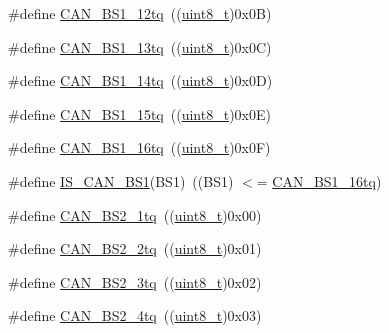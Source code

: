 \begin{DoxyCompactItemize}
\item 
\#define \hyperlink{group___c_a_n__time__quantum__in__bit__segment__1_ga14c4e928f615babc14c6a9e80ee86a6c}{C\+A\+N\+\_\+\+B\+S1\+\_\+12tq}~((\hyperlink{_p_e___types_8h_aba7bc1797add20fe3efdf37ced1182c5}{uint8\+\_\+t})0x0\+B)
\item 
\#define \hyperlink{group___c_a_n__time__quantum__in__bit__segment__1_ga2087caec94be44837c1e6965da7f6236}{C\+A\+N\+\_\+\+B\+S1\+\_\+13tq}~((\hyperlink{_p_e___types_8h_aba7bc1797add20fe3efdf37ced1182c5}{uint8\+\_\+t})0x0\+C)
\item 
\#define \hyperlink{group___c_a_n__time__quantum__in__bit__segment__1_gac0c71e1020a4fbaf66bce754bd54d8cb}{C\+A\+N\+\_\+\+B\+S1\+\_\+14tq}~((\hyperlink{_p_e___types_8h_aba7bc1797add20fe3efdf37ced1182c5}{uint8\+\_\+t})0x0\+D)
\item 
\#define \hyperlink{group___c_a_n__time__quantum__in__bit__segment__1_gaa52c8674dc7caae1089e5276cd13db5f}{C\+A\+N\+\_\+\+B\+S1\+\_\+15tq}~((\hyperlink{_p_e___types_8h_aba7bc1797add20fe3efdf37ced1182c5}{uint8\+\_\+t})0x0\+E)
\item 
\#define \hyperlink{group___c_a_n__time__quantum__in__bit__segment__1_ga3be52c699f5618cc318c143ee42f5966}{C\+A\+N\+\_\+\+B\+S1\+\_\+16tq}~((\hyperlink{_p_e___types_8h_aba7bc1797add20fe3efdf37ced1182c5}{uint8\+\_\+t})0x0\+F)
\item 
\#define \hyperlink{group___c_a_n__time__quantum__in__bit__segment__1_ga225f1457e1c6b8fc3b5af0f463933152}{I\+S\+\_\+\+C\+A\+N\+\_\+\+B\+S1}(B\+S1)~((B\+S1) $<$= \hyperlink{openmotestm_2library_2inc_2stm32f10x__can_8h_a3be52c699f5618cc318c143ee42f5966}{C\+A\+N\+\_\+\+B\+S1\+\_\+16tq})
\item 
\#define \hyperlink{group___c_a_n__time__quantum__in__bit__segment__2_gad9af25a3f61df7b09b8d6a5e81d8027e}{C\+A\+N\+\_\+\+B\+S2\+\_\+1tq}~((\hyperlink{_p_e___types_8h_aba7bc1797add20fe3efdf37ced1182c5}{uint8\+\_\+t})0x00)
\item 
\#define \hyperlink{group___c_a_n__time__quantum__in__bit__segment__2_gac43d82f74990620499f1998187ff3602}{C\+A\+N\+\_\+\+B\+S2\+\_\+2tq}~((\hyperlink{_p_e___types_8h_aba7bc1797add20fe3efdf37ced1182c5}{uint8\+\_\+t})0x01)
\item 
\#define \hyperlink{group___c_a_n__time__quantum__in__bit__segment__2_gab3d325ce4a5d0eb1ee8ee50ad4ec7e49}{C\+A\+N\+\_\+\+B\+S2\+\_\+3tq}~((\hyperlink{_p_e___types_8h_aba7bc1797add20fe3efdf37ced1182c5}{uint8\+\_\+t})0x02)
\item 
\#define \hyperlink{group___c_a_n__time__quantum__in__bit__segment__2_gaaff1c1cdd809f185299971c6437f32a0}{C\+A\+N\+\_\+\+B\+S2\+\_\+4tq}~((\hyperlink{_p_e___types_8h_aba7bc1797add20fe3efdf37ced1182c5}{uint8\+\_\+t})0x03)

\end{DoxyCompactItemize}
